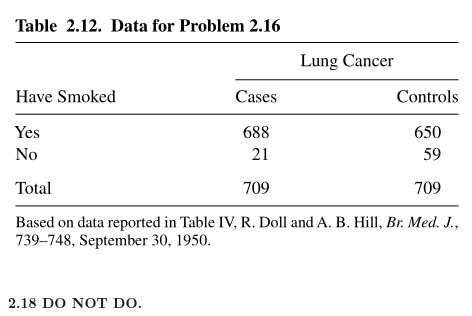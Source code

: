 \documentclass[paper=letter, fontsize=11pt]{scrartcl} %
\begin{document}
\begin{center}
	\includegraphics[scale=0.75]{table216.png}
\end{center}


\textbf{2.18 DO NOT DO.}
\end{document}
